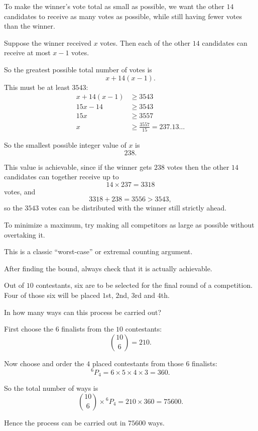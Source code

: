 \begin{solution}
To make the winner's vote total as small as possible, we want the other $14$ candidates to receive as many votes as possible, while still having fewer votes than the winner.

Suppose the winner received $x$ votes. Then each of the other $14$ candidates can receive at most $x-1$ votes.

So the greatest possible total number of votes is
\[
x + 14(x-1).
\]
This must be at least $3543$:
\begin{align*}
x + 14(x-1) &\ge 3543 \\
15x - 14 &\ge 3543 \\
15x &\ge 3557 \\
x &\ge \frac{3557}{15} = 237.13\ldots
\end{align*}

So the smallest possible integer value of $x$ is
\[
\boxed{238}.
\]

This value is achievable, since if the winner gets $238$ votes then the other $14$ candidates can together receive up to
\[
14\times 237 = 3318
\]
votes, and
\[
3318 + 238 = 3556 > 3543,
\]
so the $3543$ votes can be distributed with the winner still strictly ahead.
\end{solution}

\begin{takeaways}
\item To minimize a maximum, try making all competitors as large as possible without overtaking it.
\item This is a classic ``worst-case'' or extremal counting argument.
\item After finding the bound, always check that it is actually achievable.
\end{takeaways}

\begin{problem}
Out of $10$ contestants, six are to be selected for the final round of a competition. Four of those six will be placed $1$st, $2$nd, $3$rd and $4$th.

In how many ways can this process be carried out?
\end{problem}

\begin{solution}
First choose the $6$ finalists from the $10$ contestants:
\[
\binom{10}{6} = 210.
\]

Now choose and order the $4$ placed contestants from those $6$ finalists:
\[
{}^6P_4 = 6\times 5\times 4\times 3 = 360.
\]

So the total number of ways is
\[
\binom{10}{6}\times {}^6P_4 = 210\times 360 = 75600.
\]

Hence the process can be carried out in $\boxed{75600}$ ways.
\end{solution}

